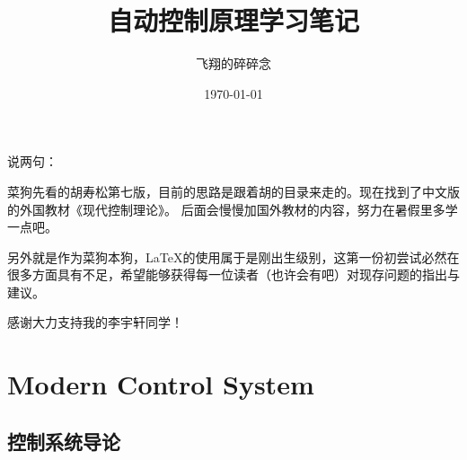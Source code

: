 \documentclass[oneside,a4paper]{ctexbook}
\title{自动控制原理学习笔记}
\author{飞翔的碎碎念}
\date{\today}
\begin{document}
\maketitle

说两句：

菜狗先看的胡寿松第七版，目前的思路是跟着胡的目录来走的。现在找到了中文版的外国教材《现代控制理论》。
后面会慢慢加国外教材的内容，努力在暑假里多学一点吧。

另外就是作为菜狗本狗，\LaTeX 的使用属于是刚出生级别，这第一份初尝试必然在很多方面具有不足，希望能够获得每一位读者（也许会有吧）对现存问题的指出与建议。

感谢大力支持我的李宇轩同学！

\tableofcontents


\part{Modern Control System}

\chapter{控制系统导论}
\end{document}
